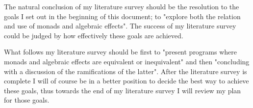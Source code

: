 \documentclass[a4paper,10pt]{article}
\begin{document}
The natural conclusion of my literature survey should be the resolution to the goals I set out
in the beginning of this document; to "explore both the relation and use of monads and
algebraic effects".
The success of my literature survey could be judged by how effectively these goals are 
achieved.

What follows my literature survey should be first to
  "present programs where monads and algebraic effects are equivalent or inequivalent"
and then
  "concluding with a discussion of the ramifications of the latter".
After the literature survey is complete I will of course be in a better position to decide
the best way to achieve these goals, thus towards the end of my literature survey I will
review my plan for those goals.


\medskip



\end{document}
